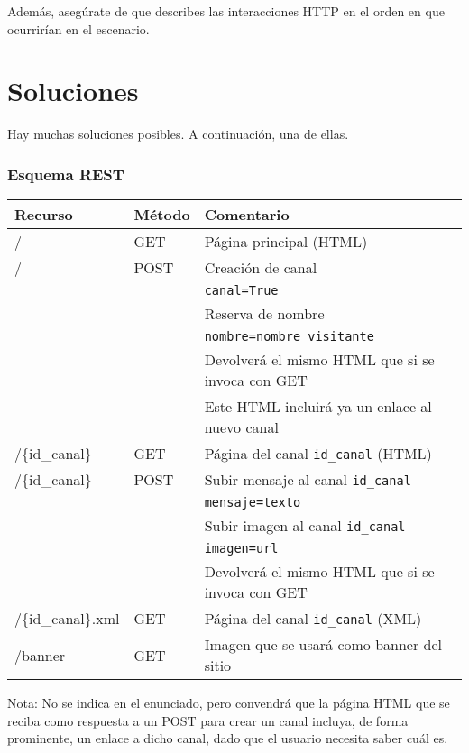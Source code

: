 {Además, asegúrate de que describes las interacciones HTTP en el orden en que ocurrirían en el escenario.

\section*{Soluciones}

Hay muchas soluciones posibles. A continuación, una de ellas.

\subsubsection*{Esquema REST}

\begin{tabular}{|l|l|l|}
  \hline
  Recurso & Método & Comentario \\ \hline \hline
  /       & GET    & Página principal (HTML) \\ \hline
  /       & POST   & Creación de canal \\
          &        & \verb|canal=True| \\
          &        & Reserva de nombre \\
          &        & \verb|nombre=nombre_visitante| \\
          &        & Devolverá el mismo HTML que si se invoca con GET \\
          &        & Este HTML incluirá ya un enlace al nuevo canal \\ \hline
  /\{id\_canal\} & GET & Página del canal \verb|id_canal| (HTML) \\ \hline
  /\{id\_canal\} & POST & Subir mensaje al canal \verb|id_canal| \\
          &        & \verb|mensaje=texto| \\
          &        & Subir imagen al canal \verb|id_canal| \\ 
          &        & \verb|imagen=url| \\
          &        & Devolverá el mismo HTML que si se invoca con GET \\ \hline
  /\{id\_canal\}.xml & GET & Página del canal \verb|id_canal| (XML) \\ \hline
  /banner & GET & Imagen que se usará como banner del sitio \\ \hline
\end{tabular}

\vspace{.3cm}

Nota: No se indica en el enunciado, pero convendrá que la página HTML que se reciba como respuesta a un POST para crear un canal incluya, de forma prominente, un enlace a dicho canal, dado que el usuario necesita saber cuál es.

}
